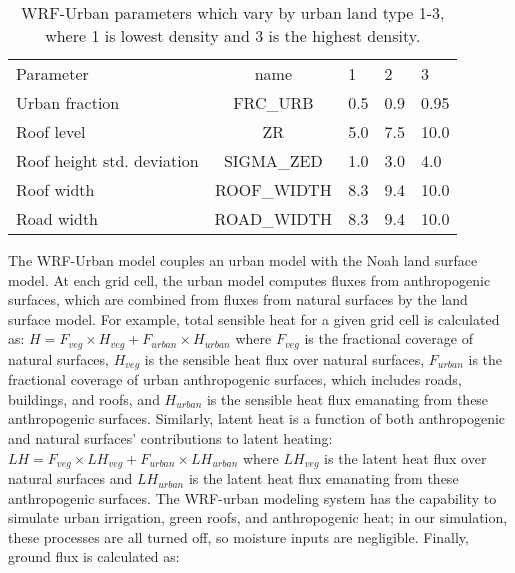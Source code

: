 \documentclass[draft,linenumbers]{agujournal}
\begin{document}
\begin{table}
\begin{tabular}{lclll}
Parameter & name & 1 & 2 & 3 \\
Urban fraction &  \textsc{FRC\_URB} & 0.5 & 0.9 & 0.95 \\
Roof level &\textsc{ZR} &5.0&  7.5 & 10.0 \\
Roof height std. deviation & \textsc{SIGMA\_ZED} & 1.0 &  3.0 &  4.0\\
Roof width &  \textsc{ROOF\_WIDTH} & 8.3& 9.4 & 10.0 \\
Road width & \textsc{ROAD\_WIDTH} &  8.3&  9.4&  10.0 
\end{tabular} 
\caption{WRF-Urban parameters which vary by urban land type 1-3, where 1 is lowest density and 3 is the highest density.}
\label{tab:urban_model}
\end{table}

The WRF-Urban model couples an urban model with the Noah land surface model. At each grid cell, the urban model computes fluxes from anthropogenic surfaces, which are combined from fluxes from natural surfaces by the land surface model. For example, total sensible heat for a given grid cell is calculated as: 
$H = F_{veg} \times H_{veg} + F_{urban}\times H_{urban}$ 
where $F_{veg}$ is the fractional coverage of natural surfaces, $H_{veg}$ is the sensible heat flux over natural surfaces, $F_{urban}$ is the fractional coverage of urban anthropogenic surfaces, which includes roads, buildings, and roofs, and $H_{urban}$ is the sensible heat flux emanating from these anthropogenic surfaces. Similarly, latent heat is a function of both anthropogenic and natural surfaces' contributions to latent heating: 
$LH = F_{veg} \times LH_{veg} + F_{urban}\times LH_{urban}$ 
where $LH_{veg}$ is the latent heat flux over natural surfaces and $LH_{urban}$ is the latent heat flux emanating from these anthropogenic surfaces.
The WRF-urban modeling system has the capability to simulate urban irrigation, green roofs, and anthropogenic heat; in our simulation, these processes are all turned off, so moisture inputs are negligible. Finally, ground flux is calculated as: 
\end{document}
